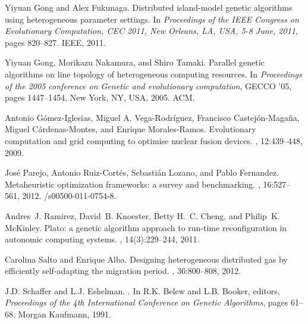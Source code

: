 \begin{thebibliography}{10}
Yiyuan Gong and Alex Fukunaga.
\newblock Distributed island-model genetic algorithms using heterogeneous
  parameter settings.
\newblock In {\em Proceedings of the IEEE Congress on Evolutionary Computation,
  CEC 2011, New Orleans, LA, USA, 5-8 June, 2011}, pages 820--827. IEEE, 2011.

Yiyuan Gong, Morikazu Nakamura, and Shiro Tamaki.
\newblock Parallel genetic algorithms on line topology of heterogeneous
  computing resources.
\newblock In {\em Proceedings of the 2005 conference on Genetic and
  evolutionary computation}, GECCO '05, pages 1447--1454, New York, NY, USA,
  2005. ACM.

Antonio G{\'o}mez-Iglesias, Miguel A. Vega-Rodr{\'i}guez, Francisco Castej{\'o}n-Maga{\~n}a,
  Miguel C{\'a}rdenas-Montes, and Enrique Morales-Ramos.
\newblock Evolutionary computation and grid computing to optimise nuclear
  fusion devices.
, 12:439--448, 2009.

José Parejo, Antonio Ruiz-Cort{\'e}s, Sebastián Lozano, and Pablo Fernandez.
\newblock Metaheuristic optimization frameworks: a survey and benchmarking.
, 16:527--561, 2012.
/s00500-011-0754-8.

Andres~J. Ramirez, David~B. Knoester, Betty H.~C. Cheng, and Philip~K.
  McKinley.
\newblock Plato: a genetic algorithm approach to run-time reconfiguration in
  autonomic computing systems.
, 14(3):229--244, 2011.

Carolina Salto and Enrique Alba.
\newblock Designing heterogeneous distributed gas by efficiently self-adapting
  the migration period.
, 36:800--808, 2012.

J.D. Schaffer and L.J. Eshelman.
.
\newblock In R.K. Belew and L.B. Booker, editors, {\em {Proceedings of the 4th
  International Conference on Genetic Algorithms}}, pages 61--68. Morgan
  Kaufmann, 1991.

\end{thebibliography}





